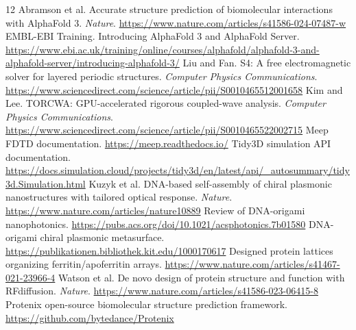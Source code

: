 \documentclass[11pt]{article}
\begin{document}
\begin{thebibliography}{12}
 Abramson et al. Accurate structure prediction of biomolecular interactions with AlphaFold 3. \emph{Nature}. \url{https://www.nature.com/articles/s41586-024-07487-w}
 EMBL-EBI Training. Introducing AlphaFold 3 and AlphaFold Server. \url{https://www.ebi.ac.uk/training/online/courses/alphafold/alphafold-3-and-alphafold-server/introducing-alphafold-3/}
 Liu and Fan. S4: A free electromagnetic solver for layered periodic structures. \emph{Computer Physics Communications}. \url{https://www.sciencedirect.com/science/article/pii/S0010465512001658}
 Kim and Lee. TORCWA: GPU-accelerated rigorous coupled-wave analysis. \emph{Computer Physics Communications}. \url{https://www.sciencedirect.com/science/article/pii/S0010465522002715}
 Meep FDTD documentation. \url{https://meep.readthedocs.io/}
 Tidy3D simulation API documentation. \url{https://docs.simulation.cloud/projects/tidy3d/en/latest/api/_autosummary/tidy3d.Simulation.html}
 Kuzyk et al. DNA-based self-assembly of chiral plasmonic nanostructures with tailored optical response. \emph{Nature}. \url{https://www.nature.com/articles/nature10889}
 Review of DNA-origami nanophotonics. \url{https://pubs.acs.org/doi/10.1021/acsphotonics.7b01580}
 DNA-origami chiral plasmonic metasurface. \url{https://publikationen.bibliothek.kit.edu/1000170617}
 Designed protein lattices organizing ferritin/apoferritin arrays. \url{https://www.nature.com/articles/s41467-021-23966-4}
 Watson et al. De novo design of protein structure and function with RFdiffusion. \emph{Nature}. \url{https://www.nature.com/articles/s41586-023-06415-8}
 Protenix open-source biomolecular structure prediction framework. \url{https://github.com/bytedance/Protenix}
\end{thebibliography}
\end{document}
